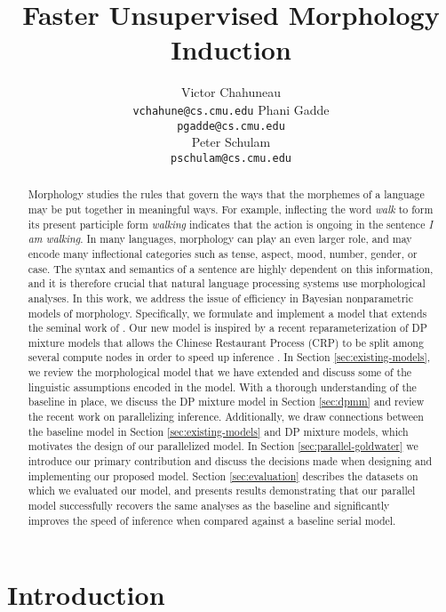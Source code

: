 \documentclass{article}
\title{Faster Unsupervised Morphology Induction}
\author{
Victor Chahuneau\\
\texttt{vchahune@cs.cmu.edu}
\And
Phani Gadde\\
\texttt{pgadde@cs.cmu.edu} \\
\And
Peter Schulam\\
\texttt{pschulam@cs.cmu.edu}
}
\begin{document}
\maketitle

\begin{abstract}
  Morphology studies the rules that govern the ways that the morphemes
  of a language may be put together in meaningful ways. For example,
  inflecting the word \textit{walk} to form its present participle
  form \textit{walking} indicates that the action is ongoing in the
  sentence \textit{I am walking}. In many languages, morphology can
  play an even larger role, and may encode many inflectional
  categories such as tense, aspect, mood, number, gender, or case. The
  syntax and semantics of a sentence are highly dependent on this
  information, and it is therefore crucial that natural language
  processing systems use morphological analyses.  In this work, we
  address the issue of efficiency in Bayesian nonparametric models of
  morphology. Specifically, we formulate and implement a model that
  extends the seminal work of \cite{goldwater2011}. Our new model is
  inspired by a recent reparameterization of DP mixture models that
  allows the Chinese Restaurant Process (CRP) to be split among
  several compute nodes in order to speed up inference
  \cite{williamson2013}. In Section \ref{sec:existing-models}, we
  review the morphological model that we have extended and discuss
  some of the linguistic assumptions encoded in the model. With a
  thorough understanding of the baseline in place, we discuss the DP
  mixture model in Section \ref{sec:dpmm} and review the recent work
  on parallelizing inference. Additionally, we draw connections
  between the baseline model in Section \ref{sec:existing-models} and
  DP mixture models, which motivates the design of our parallelized
  model. In Section \ref{sec:parallel-goldwater} we introduce our
  primary contribution and discuss the decisions made when designing
  and implementing our proposed model. Section \ref{sec:evaluation}
  describes the datasets on which we evaluated our model, and presents
  results demonstrating that our parallel model successfully recovers
  the same analyses as the baseline and significantly improves the
  speed of inference when compared against a baseline serial model.
\end{abstract}

\section{Introduction}
\label{sec:introduction}
\end{document}
